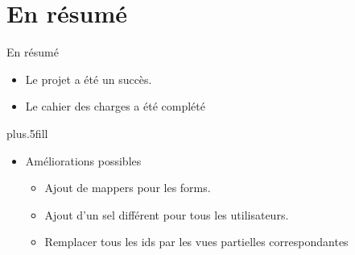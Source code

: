 \section*{En résumé}

\begin{frame}{En résumé}

  \begin{itemize}
  \item
    Le projet a été un succès.
  \item
    Le cahier des charges a été complété
  \end{itemize}
  
  \vskip0pt plus.5fill
  \begin{itemize}
  \item
    Améliorations possibles
    \begin{itemize}
    \item
      Ajout de mappers pour les forms.
    \item
      Ajout d'un sel différent pour tous les utilisateurs.
    \item
      Remplacer tous les ids par les vues partielles correspondantes
    \end{itemize}
  \end{itemize}
\end{frame}